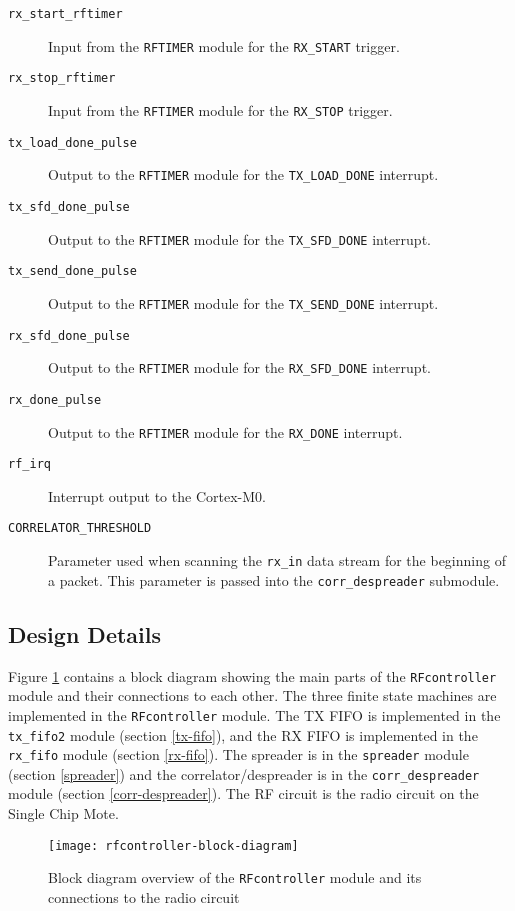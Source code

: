 \begin{description}
	\item[\texttt{rx\_start\_rftimer}] Input from the \texttt{RFTIMER} module for the \texttt{RX\_START} trigger.
	\item[\texttt{rx\_stop\_rftimer}] Input from the \texttt{RFTIMER} module for the \texttt{RX\_STOP} trigger.
	\item[\texttt{tx\_load\_done\_pulse}] Output to the \texttt{RFTIMER} module for the \texttt{TX\_LOAD\_DONE} interrupt.
	\item[\texttt{tx\_sfd\_done\_pulse}] Output to the \texttt{RFTIMER} module for the \texttt{TX\_SFD\_DONE} interrupt.
	\item[\texttt{tx\_send\_done\_pulse}] Output to the \texttt{RFTIMER} module for the \texttt{TX\_SEND\_DONE} interrupt.
	\item[\texttt{rx\_sfd\_done\_pulse}] Output to the \texttt{RFTIMER} module for the \texttt{RX\_SFD\_DONE} interrupt.
	\item[\texttt{rx\_done\_pulse}] Output to the \texttt{RFTIMER} module for the \texttt{RX\_DONE} interrupt.
	\item[\texttt{rf\_irq}] Interrupt output to the Cortex-M0.
	\item[\texttt{CORRELATOR\_THRESHOLD}] Parameter used when scanning the \texttt{rx\_in} data stream for the beginning of a packet. This parameter is passed into the \texttt{corr\_desprea\-der} submodule.
\end{description}

\subsection{Design Details}
Figure \ref{fig:rfcontroller-block-diagram} contains a block diagram showing the main parts of the \texttt{RFcontroller} module and their connections to each other. The three finite state machines are implemented in the \texttt{RFcontroller} module. The TX FIFO is implemented in the \texttt{tx\_fifo2} module (section \ref{tx-fifo}), and the RX FIFO is implemented in the \texttt{rx\_fifo} module (section \ref{rx-fifo}). The spreader is in the \texttt{spreader} module (section \ref{spreader}) and the correlator/despreader is in the \texttt{corr\_despreader} module (section \ref{corr-despreader}). The RF circuit is the radio circuit on the Single Chip Mote.

\begin{figure}
\centering
\texttt{[image: rfcontroller-block-diagram]}
\caption{Block diagram overview of the \texttt{RFcontroller} module and its connections to the radio circuit}
\label{fig:rfcontroller-block-diagram}
\end{figure}

